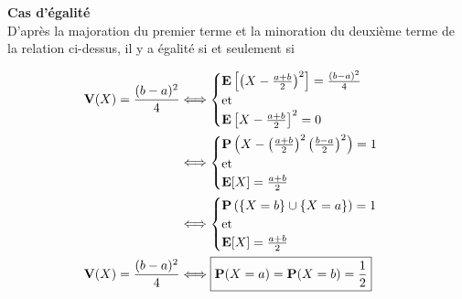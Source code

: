 \begin{solution}
    \textbf{Cas d'égalité}\\
    D'après la majoration du premier terme et la minoration du deuxième terme de la relation ci-dessus, il y a égalité  si et seulement si
    
    \begin{align*}
        \mathbf{V}(X) = \frac{(b-a)^2}{4} &\Longleftrightarrow
        \begin{cases}
            \mathbf{E} \left[ \left(X - \frac{a+b}{2} \right)^2 \right] = \frac{(b-a)^2}{4}\\
            \text{et}\\
            \mathbf{E} \left[X-\frac{a+b}{2} \right]^2 = 0
        \end{cases}\\
        &\Longleftrightarrow
        \begin{cases}
            \mathbf{P} \left( X - \left(\frac{a+b}{2} \right)^2  \left(\frac{b-a}{2} \right)^2 \right)= 1\\
            \text{et}\\
            \mathbf{E} [X] = \frac{a+b}{2}
        \end{cases}\\
        &\Longleftrightarrow
        \begin{cases}
            \mathbf{P} \left( \{ X=b \} \cup \{X=a\} \right)= 1\\
            \text{et}\\
            \mathbf{E} [X] = \frac{a+b}{2}
        \end{cases}\\
        \mathbf{V}(X) = \frac{(b-a)^2}{4} &\Longleftrightarrow \boxed{\mathbf{P}(X=a)=\mathbf{P}(X=b)=\frac{1}{2}}
    \end{align*}
\end{solution}

